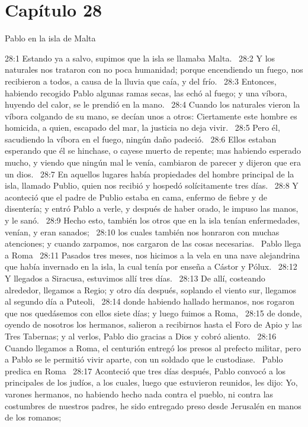 \section*{Capítulo 28}
Pablo en la isla de Malta  

28:1 Estando ya a salvo, supimos que la isla se llamaba Malta.  
28:2 Y los naturales nos trataron con no poca humanidad; porque encendiendo un fuego, nos recibieron a todos, a causa de la lluvia que caía, y del frío.  
28:3 Entonces, habiendo recogido Pablo algunas ramas secas, las echó al fuego; y una víbora, huyendo del calor, se le prendió en la mano.  
28:4 Cuando los naturales vieron la víbora colgando de su mano, se decían unos a otros: Ciertamente este hombre es homicida, a quien, escapado del mar, la justicia no deja vivir.  
28:5 Pero él, sacudiendo la víbora en el fuego, ningún daño padeció.  
28:6 Ellos estaban esperando que él se hinchase, o cayese muerto de repente; mas habiendo esperado mucho, y viendo que ningún mal le venía, cambiaron de parecer y dijeron que era un dios.  
28:7 En aquellos lugares había propiedades del hombre principal de la isla, llamado Publio, quien nos recibió y hospedó solícitamente tres días.  
28:8 Y aconteció que el padre de Publio estaba en cama, enfermo de fiebre y de disentería; y entró Pablo a verle, y después de haber orado, le impuso las manos, y le sanó.  
28:9 Hecho esto, también los otros que en la isla tenían enfermedades, venían, y eran sanados;  
28:10 los cuales también nos honraron con muchas atenciones; y cuando zarpamos, nos cargaron de las cosas necesarias.  
Pablo llega a Roma  
28:11 Pasados tres meses, nos hicimos a la vela en una nave alejandrina que había invernado en la isla, la cual tenía por enseña a Cástor y Pólux.  
28:12 Y llegados a Siracusa, estuvimos allí tres días.  
28:13 De allí, costeando alrededor, llegamos a Regio; y otro día después, soplando el viento sur, llegamos al segundo día a Puteoli,  
28:14 donde habiendo hallado hermanos, nos rogaron que nos quedásemos con ellos siete días; y luego fuimos a Roma,  
28:15 de donde, oyendo de nosotros los hermanos, salieron a recibirnos hasta el Foro de Apio y las Tres Tabernas; y al verlos, Pablo dio gracias a Dios y cobró aliento.  
28:16 Cuando llegamos a Roma, el centurión entregó los presos al prefecto militar, pero a Pablo se le permitió vivir aparte, con un soldado que le custodiase.  
Pablo predica en Roma  
28:17 Aconteció que tres días después, Pablo convocó a los principales de los judíos, a los cuales, luego que estuvieron reunidos, les dijo: Yo, varones hermanos, no habiendo hecho nada contra el pueblo, ni contra las costumbres de nuestros padres, he sido entregado preso desde Jerusalén en manos de los romanos;  
